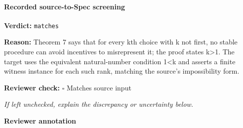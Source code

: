 \documentclass[10pt]{article}
\newcommand{\reviewerbox}{%
  \par\noindent\fbox{\parbox{0.96\linewidth}{\rule{0pt}{0.38in}}}\par
}
\newcommand{\reviewmatch}[1]{%
  \par\noindent\textbf{Reviewer check:} $\square$\; #1\par
  \noindent\emph{If left unchecked, explain the discrepancy or uncertainty below.}\par
}
\begin{document}
\paragraph{Recorded source-to-Spec screening}
\textbf{Verdict:} \texttt{matches}
\\
{\raggedright
\textbf{Reason:} Theorem 7 says that for every kth choice with k not first, no stable procedure can avoid incentives to misrepresent it;\allowbreak{} the proof states k>1.\allowbreak{}  The target uses the equivalent natural-\allowbreak{}number condition 1<k and asserts a finite witness instance for each such rank, matching the source's impossibility form.\allowbreak{}
\par}
\reviewmatch{Matches source input}
\noindent\textbf{Reviewer annotation}\par
\reviewerbox
\end{document}
